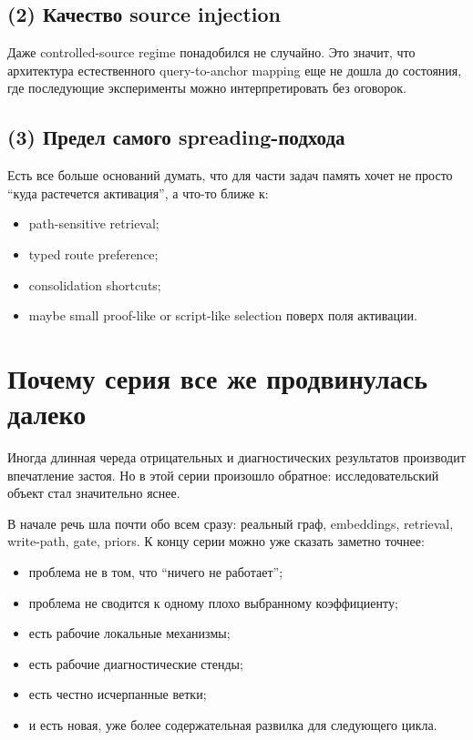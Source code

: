 \subsection{(2) Качество source injection}

Даже controlled-source regime понадобился не случайно. Это значит, что архитектура
естественного query-to-anchor mapping еще не дошла до состояния, где последующие
эксперименты можно интерпретировать без оговорок.

\subsection{(3) Предел самого spreading-подхода}

Есть все больше оснований думать, что для части задач память хочет не просто
``куда растечется активация'', а что-то ближе к:

\begin{itemize}[leftmargin=2em]
\item path-sensitive retrieval;
\item typed route preference;
\item consolidation shortcuts;
\item maybe small proof-like or script-like selection поверх поля активации.
\end{itemize}

\section{Почему серия все же продвинулась далеко}

Иногда длинная череда отрицательных и диагностических результатов производит
впечатление застоя. Но в этой серии произошло обратное: исследовательский объект
стал значительно яснее.

В начале речь шла почти обо всем сразу: реальный граф, embeddings, retrieval,
write-path, gate, priors. К концу серии можно уже сказать заметно точнее:

\begin{itemize}[leftmargin=2em]
\item проблема не в том, что ``ничего не работает'';
\item проблема не сводится к одному плохо выбранному коэффициенту;
\item есть рабочие локальные механизмы;
\item есть рабочие диагностические стенды;
\item есть честно исчерпанные ветки;
\item и есть новая, уже более содержательная развилка для следующего цикла.
\end{itemize}


